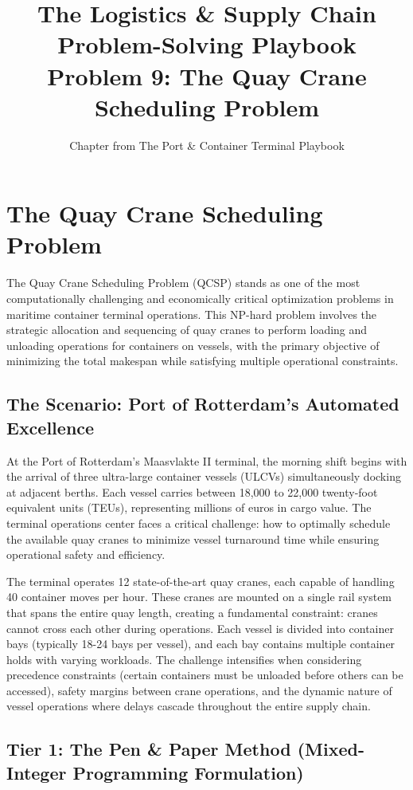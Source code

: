 \documentclass{article}
\title{The Logistics \& Supply Chain Problem-Solving Playbook\\Problem 9: The Quay Crane Scheduling Problem}
\author{Chapter from The Port \& Container Terminal Playbook}
\date{}
\begin{document}
\maketitle

\section{The Quay Crane Scheduling Problem}

The Quay Crane Scheduling Problem (QCSP) stands as one of the most computationally challenging and economically critical optimization problems in maritime container terminal operations. This NP-hard problem involves the strategic allocation and sequencing of quay cranes to perform loading and unloading operations for containers on vessels, with the primary objective of minimizing the total makespan while satisfying multiple operational constraints.

\subsection{The Scenario: Port of Rotterdam's Automated Excellence}

At the Port of Rotterdam's Maasvlakte II terminal, the morning shift begins with the arrival of three ultra-large container vessels (ULCVs) simultaneously docking at adjacent berths. Each vessel carries between 18,000 to 22,000 twenty-foot equivalent units (TEUs), representing millions of euros in cargo value. The terminal operations center faces a critical challenge: how to optimally schedule the available quay cranes to minimize vessel turnaround time while ensuring operational safety and efficiency.

The terminal operates 12 state-of-the-art quay cranes, each capable of handling 40 container moves per hour. These cranes are mounted on a single rail system that spans the entire quay length, creating a fundamental constraint: cranes cannot cross each other during operations. Each vessel is divided into container bays (typically 18-24 bays per vessel), and each bay contains multiple container holds with varying workloads. The challenge intensifies when considering precedence constraints (certain containers must be unloaded before others can be accessed), safety margins between crane operations, and the dynamic nature of vessel operations where delays cascade throughout the entire supply chain.

\subsection{Tier 1: The Pen \& Paper Method (Mixed-Integer Programming Formulation)}
\end{document}
